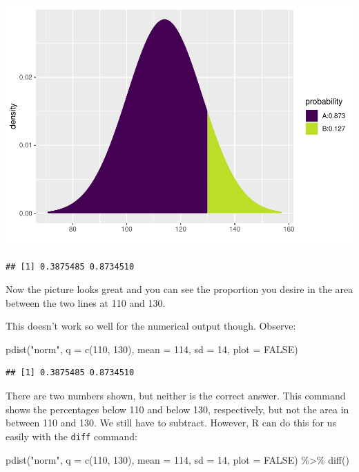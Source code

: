 \documentclass[
]{book}
\newenvironment{Shaded}{\begin{snugshade}}{\end{snugshade}}
\newcommand{\AttributeTok}[1]{\textcolor[rgb]{0.77,0.63,0.00}{#1}}
\newcommand{\ConstantTok}[1]{\textcolor[rgb]{0.00,0.00,0.00}{#1}}
\newcommand{\DecValTok}[1]{\textcolor[rgb]{0.00,0.00,0.81}{#1}}
\newcommand{\FunctionTok}[1]{\textcolor[rgb]{0.00,0.00,0.00}{#1}}
\newcommand{\NormalTok}[1]{#1}
\newcommand{\SpecialCharTok}[1]{\textcolor[rgb]{0.00,0.00,0.00}{#1}}
\newcommand{\StringTok}[1]{\textcolor[rgb]{0.31,0.60,0.02}{#1}}
\begin{document}
\includegraphics{intro_stats_files/figure-latex/unnamed-chunk-341-1.pdf}

\begin{verbatim}
## [1] 0.3875485 0.8734510
\end{verbatim}

Now the picture looks great and you can see the proportion you desire in the area between the two lines at 110 and 130.

This doesn't work so well for the numerical output though. Observe:

\begin{Shaded}
\begin{Highlighting}[]
\FunctionTok{pdist}\NormalTok{(}\StringTok{"norm"}\NormalTok{, }\AttributeTok{q =} \FunctionTok{c}\NormalTok{(}\DecValTok{110}\NormalTok{, }\DecValTok{130}\NormalTok{), }\AttributeTok{mean =} \DecValTok{114}\NormalTok{, }\AttributeTok{sd =} \DecValTok{14}\NormalTok{, }\AttributeTok{plot =} \ConstantTok{FALSE}\NormalTok{)}
\end{Highlighting}
\end{Shaded}

\begin{verbatim}
## [1] 0.3875485 0.8734510
\end{verbatim}

There are two numbers shown, but neither is the correct answer. This command shows the percentages below 110 and below 130, respectively, but not the area in between 110 and 130. We still have to subtract. However, R can do this for us easily with the \texttt{diff} command:

\begin{Shaded}
\begin{Highlighting}[]
\FunctionTok{pdist}\NormalTok{(}\StringTok{"norm"}\NormalTok{, }\AttributeTok{q =} \FunctionTok{c}\NormalTok{(}\DecValTok{110}\NormalTok{, }\DecValTok{130}\NormalTok{), }\AttributeTok{mean =} \DecValTok{114}\NormalTok{, }\AttributeTok{sd =} \DecValTok{14}\NormalTok{, }\AttributeTok{plot =} \ConstantTok{FALSE}\NormalTok{) }\SpecialCharTok{\%\textgreater{}\%}
    \FunctionTok{diff}\NormalTok{()}
\end{Highlighting}
\end{Shaded}
\end{document}
